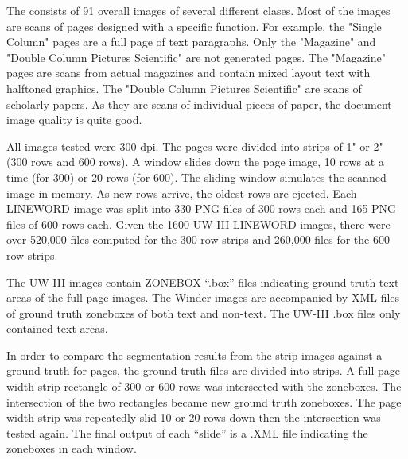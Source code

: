 \documentclass[conference]{IEEEtran}
\begin{document}
The \cite{winder2010extending} consists of 91 overall images of several
different clases. Most of the images are scans of pages designed with a
specific function. For example, the "Single Column" pages are a full page of
text paragraphs. Only the "Magazine" and "Double Column Pictures Scientific"
are not generated pages. The "Magazine" pages are scans from actual magazines
and contain mixed layout text with halftoned graphics. The "Double Column
Pictures Scientific" are scans of scholarly papers.  As they are scans of
individual pieces of paper, the document image quality is quite good.

All images tested were 300 dpi.  The pages were divided into strips of 1" or 2"
(300 rows and 600 rows). A window slides down the page image, 10 rows at a time
(for 300) or 20 rows (for 600).  The sliding window simulates the scanned image
in memory. As new rows arrive, the oldest rows are ejected.  Each LINEWORD
image was split into 330 PNG files of 300 rows each and 165 PNG files of 600
rows each.  Given the 1600 UW-III LINEWORD images, there were over 520,000
files computed for the 300 row strips and 260,000 files for the 600 row strips.


The UW-III images contain ZONEBOX “.box” files indicating ground truth text
areas of the full page images. The Winder images are accompanied by XML files
of ground truth zoneboxes of both text and non-text. The UW-III .box files only
contained text areas.

In order to compare the segmentation results from the strip images against a
ground truth for pages, the ground truth files are divided into strips.  A full
page width strip rectangle of 300 or 600 rows was intersected with the
zoneboxes. The intersection of the two rectangles became new ground truth
zoneboxes. The page width strip was repeatedly slid 10 or 20 rows down then the
intersection was tested again. The final output of each “slide” is a .XML file
indicating the zoneboxes in each window.
\end{document}
